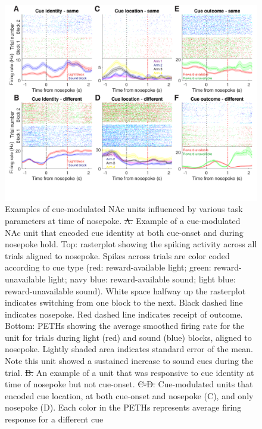\documentclass[11pt]{article}
\newcommand{\bsf}[1]{\textbf{#1}}
\providecommand{\DIFadd}[1]{{\protect\color{blue}\uwave{#1}}} %
\providecommand{\DIFdel}[1]{{\protect\color{red}\sout{#1}}}                      %
\providecommand{\DIFaddFL}[1]{\DIFadd{#1}} %
\providecommand{\DIFdelFL}[1]{\DIFdel{#1}} %
\providecommand{\DIFaddbeginFL}{} %
\providecommand{\DIFaddendFL}{} %
\providecommand{\DIFdelbeginFL}{} %
\providecommand{\DIFdelendFL}{} %
\newcommand{\DIFscaledelfig}{0.5}
\newlength{\DIFdelgraphicswidth} %
\newlength{\DIFdelgraphicsheight} %
\newcommand{\DIFaddincludegraphics}[2][]{{\color{blue}\fbox{\DIFOincludegraphics[#1]{#2}}}} %
\newcommand{\DIFdelincludegraphics}[2][]{%
\sbox{\DIFdelgraphicsbox}{\DIFOincludegraphics[#1]{#2}}%
\settoboxwidth{\DIFdelgraphicswidth}{\DIFdelgraphicsbox} %
\settoboxtotalheight{\DIFdelgraphicsheight}{\DIFdelgraphicsbox} %
\scalebox{\DIFscaledelfig}{%
\parbox[b]{\DIFdelgraphicswidth}{\usebox{\DIFdelgraphicsbox}\\[-\baselineskip] \rule{\DIFdelgraphicswidth}{0em}}\llap{\resizebox{\DIFdelgraphicswidth}{\DIFdelgraphicsheight}{%
\setlength{\unitlength}{\DIFdelgraphicswidth}%
\begin{picture}(1,1)%
\thicklines\linethickness{2pt} %
{\color[rgb]{1,0,0}\put(0,0){\framebox(1,1){}}}%
{\color[rgb]{1,0,0}\put(0,0){\line( 1,1){1}}}%
{\color[rgb]{1,0,0}\put(0,1){\line(1,-1){1}}}%
\end{picture}%
}\hspace*{3pt}}} %
} %
\DeclareRobustCommand{\DIFaddbeginFL}{\DIFOaddbeginFL \let\includegraphics\DIFaddincludegraphics} %
\DeclareRobustCommand{\DIFaddendFL}{\DIFOaddendFL \let\includegraphics\DIFOincludegraphics} %
\DeclareRobustCommand{\DIFdelbeginFL}{\DIFOdelbeginFL \let\includegraphics\DIFdelincludegraphics} %
\DeclareRobustCommand{\DIFdelendFL}{\DIFOaddendFL \let\includegraphics\DIFOincludegraphics} %
\begin{document}
{\begin{figure}[h]
\centering
\includegraphics[width=\textwidth]{Fig 9 - NP Neural examples.png}
\caption{Examples of cue-modulated NAc units influenced by various task
  parameters at time of nosepoke. \DIFdelbeginFL \DIFdelFL{A. }\DIFdelendFL \DIFaddbeginFL \DIFaddFL{\bsf{A}: }\DIFaddendFL Example of a cue-modulated NAc unit
  that encoded cue identity at both cue-onset and during nosepoke hold. Top:
  rasterplot showing the spiking activity across all trials aligned to
  nosepoke. Spikes across trials are color coded according to cue type (red:
  reward-available light; green: reward-unavailable light; navy blue:
  reward-available sound; light blue: reward-unavailable sound). White space
  halfway up the rasterplot indicates switching from one block to the
  next. Black dashed line indicates nosepoke. Red dashed line indicates receipt
  of outcome. Bottom: PETHs showing the average smoothed firing rate for the
  unit for trials during light (red) and sound (blue) blocks, aligned to
  nosepoke. Lightly shaded area indicates standard error of the mean. Note this
  unit showed a sustained increase to sound cues during the trial. \DIFdelbeginFL \DIFdelFL{B. }\DIFdelendFL \DIFaddbeginFL \DIFaddFL{\bsf{B}: }\DIFaddendFL An
  example of a unit that was responsive to cue identity at time of nosepoke but
  not cue-onset. \DIFdelbeginFL \DIFdelFL{C-D. }\DIFdelendFL \DIFaddbeginFL \DIFaddFL{\bsf{C-D}: }\DIFaddendFL Cue-modulated units that encoded cue location, at
  both cue-onset and nosepoke (C), and only nosepoke (D). Each color in the
  PETHs represents average firing response for a different cue
}
\end{figure}}
\end{document}
